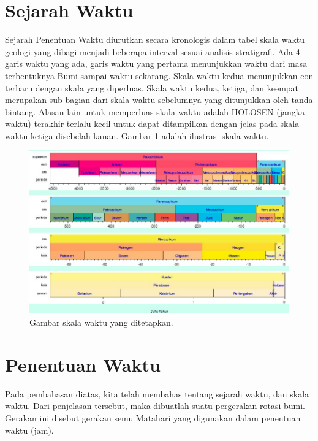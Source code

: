  

\section{Sejarah Waktu}

Sejarah Penentuan Waktu diurutkan secara kronologis dalam tabel skala waktu geologi 
yang dibagi menjadi beberapa interval sesuai analisis stratigrafi. 
Ada 4 garis waktu yang ada, garis waktu yang pertama menunjukkan waktu dari masa terbentuknya Bumi sampai waktu sekarang\cite{suryasejarah}.  Skala waktu kedua menunjukkan eon terbaru dengan skala yang diperluas. Skala waktu kedua, ketiga, dan keempat merupakan sub bagian dari skala waktu sebelumnya yang ditunjukkan oleh tanda bintang. 
Alasan lain untuk memperluas skala waktu adalah HOLOSEN (jangka waktu) terakhir terlalu kecil untuk dapat ditampilkan dengan jelas
pada skala waktu ketiga disebelah kanan. Gambar \ref{sejarahpenentuan} adalah ilustrasi skala waktu.

\begin{figure}[ht]
\centerline{\includegraphics[width=1\textwidth]{figures/sejarahpenentuan.JPG}}
\caption{Gambar skala waktu yang ditetapkan.}
\label{sejarahpenentuan}
\end{figure}

\section{Penentuan Waktu}
Pada pembahasan diatas, kita telah membahas tentang sejarah waktu, dan skala waktu. 
Dari penjelasan tersebut, maka dibuatlah suatu pergerakan rotasi bumi. 
Gerakan ini disebut gerakan semu Matahari yang digunakan dalam penentuan waktu (jam).

